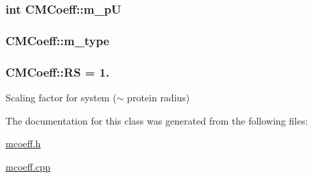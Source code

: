 \hypertarget{classCMCoeff_ac00d5938d669575bf71826ee725ccf46}{
\subsubsection[{m\-\_\-p\-U}]{\setlength{\rightskip}{0pt plus 5cm}int C\-M\-Coeff\-::m\-\_\-p\-U\hspace{0.3cm}{\ttfamily [protected]}}}\label{classCMCoeff_ac00d5938d669575bf71826ee725ccf46}
\hypertarget{classCMCoeff_afe0cd2c61d33f32a058302fb53c33ccf}{
\subsubsection[{m\-\_\-type}]{ C\-M\-Coeff\-::m\-\_\-type\hspace{0.3cm}{\ttfamily [protected]}}}\label{classCMCoeff_afe0cd2c61d33f32a058302fb53c33ccf}
\hypertarget{classCMCoeff_a512caa3ff1994cbde85011489b8f34ce}{
\subsubsection[{R\-S}]{ C\-M\-Coeff\-::\-R\-S = 1.\hspace{0.3cm}{\ttfamily [static]}}}\label{classCMCoeff_a512caa3ff1994cbde85011489b8f34ce}


Scaling factor for system ($\sim$ protein radius) 



The documentation for this class was generated from the following files\-:\begin{DoxyCompactItemize}
\item 
\hyperlink{mcoeff_8h}{mcoeff.\-h}\item 
\hyperlink{mcoeff_8cpp}{mcoeff.\-cpp}\end{DoxyCompactItemize}

